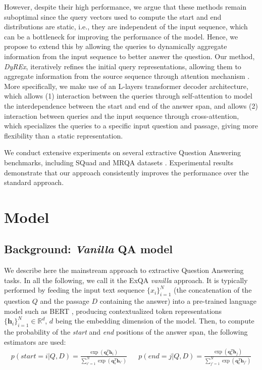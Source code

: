 \documentclass{article}
\begin{document}
However, despite their high performance, we argue that these methods remain suboptimal since the query vectors used to compute the start and end distributions are static, i.e., they are independent of the input sequence, which can be a bottleneck for improving the performance of the model. Hence, we propose to extend this by allowing the queries to dynamically aggregate information from the input sequence to better answer the question. Our method, \textit{DyREx}, iteratively refines the initial query representations, allowing them to aggregate information from the source sequence through attention mechanism \citep{attention_bahdanau, attention_is_all_u_need}. More specifically, we make use of an L-layers transformer decoder architecture, which allows (1) interaction between the queries through self-attention to model the interdependence between the start and end of the answer span, and allows (2) interaction between queries and the input sequence through cross-attention, which specializes the queries to a specific input question and passage, giving more flexibility than a static representation. 

We conduct extensive experiments on several extractive Question Answering benchmarks, including SQuad \citep{SQuAD} and MRQA datasets \citep{MRQA_data}. Experimental results demonstrate that our approach consistently improves the performance over the standard approach.


\section{Model} 
\subsection{Background: \textit{Vanilla} QA model \label{sec:van}}
We describe here the mainstream approach to extractive Question Answering tasks. In all the following, we call it the ExQA \textit{vanilla} approach. It is typically performed by feeding the input text sequence $\{x_i\}_{i=1}^N$ (the concatenation of the question $Q$ and the passage $D$ containing the answer) into a pre-trained language model such as BERT \citep{BERT}, producing contextualized token representations $\{\textbf{h}_i\}_{i=1}^N \in \mathbb{R}^d$, $d$ being the embedding dimension of the model. Then, to compute the probability of the \textit{start} and \textit{end} positions of the answer span, the following estimators are used:
\begin{align}
    p(\textit{start} = i|Q, D) = \frac{\exp(\textbf{q}_s^T \textbf{h}_i)}{\sum_{i'=1}^{N} \exp(\textbf{q}_s^T \textbf{h}_{i'})} &&
    p(\textit{end} = j|Q, D) = \frac{\exp(\textbf{q}_e^T \textbf{h}_j)}{\sum_{j'=1}^{N} \exp(\textbf{q}_e^T \textbf{h}_{j'})}
\label{eq:1}
\end{align}
\end{document}
